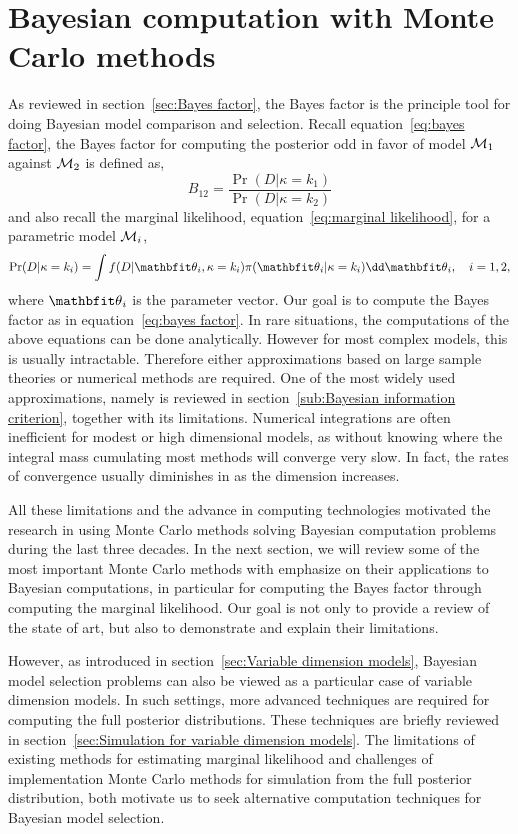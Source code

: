 \chapter{Bayesian computation with Monte Carlo methods}
\label{cha:Bayesian computation with Monte Carlo methods}

As reviewed in section~\ref{sec:Bayes factor}, the Bayes factor is the
principle tool for doing Bayesian model comparison and selection. Recall
equation~\eqref{eq:bayes factor}, the Bayes factor for computing the posterior
odd in favor of model $\mathcal{M}_1$ against $\mathcal{M}_2$ is defined as,
\[
  B_{12} = \frac{\Pr(D|\kappa=k_1)}{\Pr(D|\kappa=k_2)}
\]
and also recall the marginal likelihood, equation~\eqref{eq:marginal
  likelihood}, for a parametric model $\mathcal{M}_i$,
\[
  \Pr(D|\kappa=k_i)
  = \int f(D|\bth_i,\kappa=k_i)\pi(\bth_i|\kappa=k_i)\dd\bth_i,
  \quad i = 1, 2,
\]
where $\bth_i$ is the parameter vector. Our goal is to compute the Bayes
factor as in equation~\eqref{eq:bayes factor}. In rare situations, the
computations of the above equations can be done analytically. However for most
complex models, this is usually intractable. Therefore either approximations
based on large sample theories or numerical methods are required. One of the
most widely used approximations, namely \bic is reviewed in
section~\ref{sub:Bayesian information criterion}, together with its
limitations. Numerical integrations are often inefficient for modest or high
dimensional models, as without knowing where the integral mass cumulating most
methods will converge very slow. In fact, the rates of convergence usually
diminishes in as the dimension increases.

All these limitations and the advance in computing technologies motivated the
research in using Monte Carlo methods solving Bayesian computation problems
during the last three decades. In the next section, we will review some of the
most important Monte Carlo methods with emphasize on their applications to
Bayesian computations, in particular for computing the Bayes factor through
computing the marginal likelihood. Our goal is not only to provide a review of
the state of art, but also to demonstrate and explain their limitations.

However, as introduced in section~\ref{sec:Variable dimension models},
Bayesian model selection problems can also be viewed as a particular case of
variable dimension models. In such settings, more advanced techniques are
required for computing the full posterior distributions. These techniques are
briefly reviewed in section~\ref{sec:Simulation for variable dimension
  models}. The limitations of existing methods for estimating marginal
likelihood and challenges of implementation Monte Carlo methods for simulation
from the full posterior distribution, both motivate us to seek alternative
computation techniques for Bayesian model selection.

